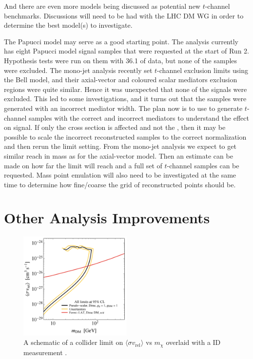 And there are even more models \cite{Bauer:2017fsw} being discussed as potential new $t$-channel benchmarks. Discussions will need to be had with the LHC DM WG in order to determine the best model(s) to investigate.

The Papucci model may serve as a good starting point. The \monoZ analysis currently has eight Papucci model signal samples that were requested at the start of Run 2. Hypothesis tests were run on them with 36.1 \ifb of data, but none of the samples were excluded. The mono-jet analysis recently set $t$-channel exclusion limits using the Bell model, and their axial-vector and coloured scalar mediators exclusion regions were quite similar. Hence it was unexpected that none of the \monoZ signals were excluded. This led to some investigations, and it turns out that the \monoZ samples were generated with an incorrect mediator width. The plan now is to use \madgraph to generate $t$-channel samples with the correct and incorrect mediators to understand the effect on signal. If only the cross section is affected and not the \etmiss, then it may be possible to scale the incorrect reconstructed samples to the correct normalization and then rerun the limit setting. From the mono-jet analysis we expect to get similar reach in mass as for the axial-vector model. Then an estimate can be made on how far the limit will reach and a full set of $t$-channel samples can be requested. Mass point emulation will also need to be investigated at the same time to determine how fine/coarse the grid of reconstructed points should be.

\section{Other Analysis Improvements}

\begin{figure}[htb]
\centering
\includegraphics[width=0.5\textwidth]{Figures/id.png}
\caption{A schematic of a collider limit on $\langle \sigma v_\text{rel} \rangle$ vs $m_\chi$ overlaid with a ID measurement \cite{Boveia:2016mrp}.}
\label{fig:id}
\end{figure}

